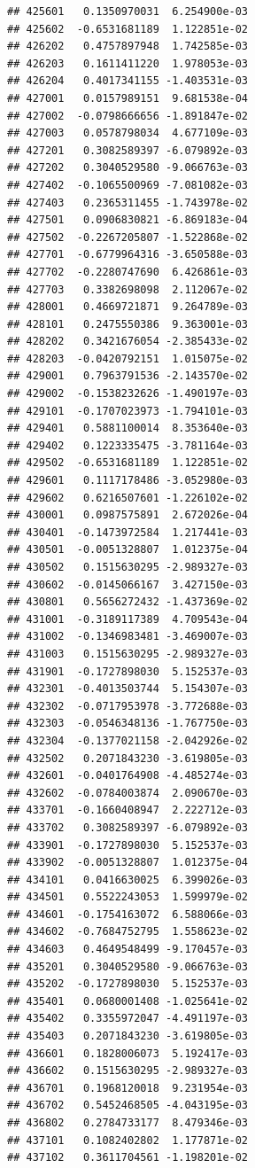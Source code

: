 \documentclass[ignorenonframetext,]{beamer}
\begin{document}
\begin{frame}[fragile]
\begin{verbatim}
## 425601   0.1350970031  6.254900e-03
## 425602  -0.6531681189  1.122851e-02
## 426202   0.4757897948  1.742585e-03
## 426203   0.1611411220  1.978053e-03
## 426204   0.4017341155 -1.403531e-03
## 427001   0.0157989151  9.681538e-04
## 427002  -0.0798666656 -1.891847e-02
## 427003   0.0578798034  4.677109e-03
## 427201   0.3082589397 -6.079892e-03
## 427202   0.3040529580 -9.066763e-03
## 427402  -0.1065500969 -7.081082e-03
## 427403   0.2365311455 -1.743978e-02
## 427501   0.0906830821 -6.869183e-04
## 427502  -0.2267205807 -1.522868e-02
## 427701  -0.6779964316 -3.650588e-03
## 427702  -0.2280747690  6.426861e-03
## 427703   0.3382698098  2.112067e-02
## 428001   0.4669721871  9.264789e-03
## 428101   0.2475550386  9.363001e-03
## 428202   0.3421676054 -2.385433e-02
## 428203  -0.0420792151  1.015075e-02
## 429001   0.7963791536 -2.143570e-02
## 429002  -0.1538232626 -1.490197e-03
## 429101  -0.1707023973 -1.794101e-03
## 429401   0.5881100014  8.353640e-03
## 429402   0.1223335475 -3.781164e-03
## 429502  -0.6531681189  1.122851e-02
## 429601   0.1117178486 -3.052980e-03
## 429602   0.6216507601 -1.226102e-02
## 430001   0.0987575891  2.672026e-04
## 430401  -0.1473972584  1.217441e-03
## 430501  -0.0051328807  1.012375e-04
## 430502   0.1515630295 -2.989327e-03
## 430602  -0.0145066167  3.427150e-03
## 430801   0.5656272432 -1.437369e-02
## 431001  -0.3189117389  4.709543e-04
## 431002  -0.1346983481 -3.469007e-03
## 431003   0.1515630295 -2.989327e-03
## 431901  -0.1727898030  5.152537e-03
## 432301  -0.4013503744  5.154307e-03
## 432302  -0.0717953978 -3.772688e-03
## 432303  -0.0546348136 -1.767750e-03
## 432304  -0.1377021158 -2.042926e-02
## 432502   0.2071843230 -3.619805e-03
## 432601  -0.0401764908 -4.485274e-03
## 432602  -0.0784003874  2.090670e-03
## 433701  -0.1660408947  2.222712e-03
## 433702   0.3082589397 -6.079892e-03
## 433901  -0.1727898030  5.152537e-03
## 433902  -0.0051328807  1.012375e-04
## 434101   0.0416630025  6.399026e-03
## 434501   0.5522243053  1.599979e-02
## 434601  -0.1754163072  6.588066e-03
## 434602  -0.7684752795  1.558623e-02
## 434603   0.4649548499 -9.170457e-03
## 435201   0.3040529580 -9.066763e-03
## 435202  -0.1727898030  5.152537e-03
## 435401   0.0680001408 -1.025641e-02
## 435402   0.3355972047 -4.491197e-03
## 435403   0.2071843230 -3.619805e-03
## 436601   0.1828006073  5.192417e-03
## 436602   0.1515630295 -2.989327e-03
## 436701   0.1968120018  9.231954e-03
## 436702   0.5452468505 -4.043195e-03
## 436802   0.2784733177  8.479346e-03
## 437101   0.1082402802  1.177871e-02
## 437102   0.3611704561 -1.198201e-02

\end{verbatim}
\end{frame}
\end{document}
